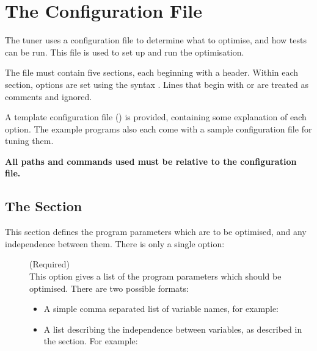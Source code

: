 \documentclass[a4paper, draft]{article}
\begin{document}
\section{The Configuration File}
\label{sec:conf-file}
The tuner uses a configuration file to determine what to optimise, and how 
tests can be run. This file is used to set up and run the optimisation.

The file must contain five sections, each beginning with a 
 header. Within each section, options are set 
using the syntax . Lines that begin with 
\confsnippet{\#} or \confsnippet{;} are treated as comments and ignored.

A template configuration file () is provided, 
containing some explanation of each option. The example programs also each come 
with a sample configuration file for tuning them.

\textbf{All paths and commands used must be relative to the configuration 
file.}

\subsection{The \confsnippet{[variables]} Section}
This section defines the program parameters which are to be optimised, and 
any independence between them. There is only a single option:

\begin{description}
    \item[] (Required) \\
        This option gives a list of the program parameters which should be 
        optimised. There are two possible formats:
        \begin{itemize}
            \item A simple comma separated list of variable names, 
                for example: \\

            \item A list describing the independence between variables, 
                as described in the \emph{} section. 
                For example: \\
                 \\
        \end{itemize}
\end{description}
\end{document}
